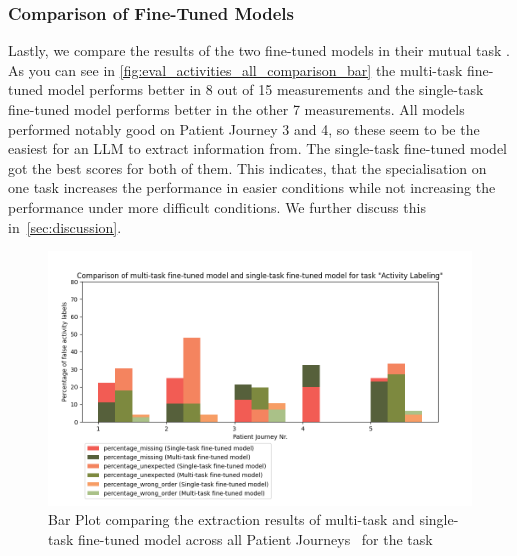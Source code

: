 \subsubsection{Comparison of Fine-Tuned Models}
Lastly, we compare the results of the two fine-tuned models in their mutual task . As you can see in \autoref{fig:eval_activities_all_comparison_bar} the multi-task fine-tuned model performs better in 8 out of 15 measurements and the single-task fine-tuned model performs better in the other 7 measurements. All models performed notably good on Patient Journey 3 and 4, so these seem to be the easiest for an LLM to extract information from. The single-task fine-tuned model got the best scores for both of them. This indicates, that the specialisation on one task increases the performance in easier conditions while not increasing the performance under more difficult conditions. We further discuss this in~\autoref{sec:discussion}.

\begin{figure}
    \centering
    \includegraphics[width=\textwidth]{bachelor_thesis/images/activites_all-single_vs_multi.png}
    \caption{Bar Plot comparing the extraction results of multi-task and single-task fine-tuned model across all Patient Journeys~ for the task } 
    \label{fig:eval_activities_all_comparison_bar}
\end{figure}
